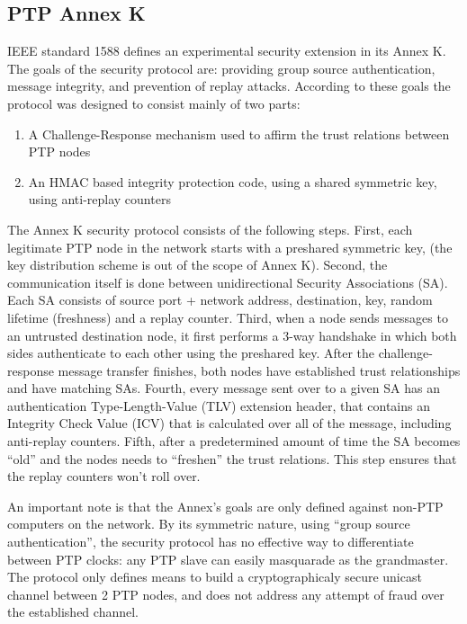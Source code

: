 \documentclass[11pt]{article}
\begin{document}
\subsection{PTP Annex K}\label{appendix}

IEEE standard 1588 defines an experimental security extension in its Annex K. The goals of the security protocol are: providing group source authentication, message integrity, and prevention of replay attacks. According to these goals the protocol was designed to consist mainly of two parts:

\begin{enumerate}

  \item A Challenge-Response mechanism used to affirm the trust relations between PTP nodes

  \item An HMAC \cite{HMAC} based integrity protection code, using a shared symmetric key, using anti-replay counters

\end{enumerate}



The Annex K security protocol consists of the following steps. First, each legitimate PTP node in the network starts with a preshared symmetric key, (the key distribution scheme is out of the scope of Annex K). Second, the communication itself is done between unidirectional Security Associations (SA). Each SA consists of source port + network address, destination, key, random lifetime (freshness) and a replay counter. Third, when a node sends messages to an untrusted destination node, it first performs a 3-way handshake in which both sides authenticate to each other using the preshared key. After the challenge-response message transfer finishes, both nodes have established trust relationships and have matching SAs. Fourth, every message sent over to a given SA has an authentication Type-Length-Value (TLV) extension header, that contains an Integrity Check Value (ICV) that is calculated over all of the message, including anti-replay counters. Fifth, after a predetermined amount of time the SA becomes ``old'' and the nodes needs to ``freshen'' the trust relations. This step ensures that the replay counters won't roll over.



An important note is that the Annex's goals are only defined against non-PTP computers on the network. By its symmetric nature, using ``group source authentication'', the security protocol has no effective way to differentiate between PTP clocks: any PTP slave can easily masquarade as the grandmaster. The protocol only defines means to build a cryptographicaly secure unicast channel between 2 PTP nodes, and does not address any attempt of fraud over the established channel.
\end{document}
